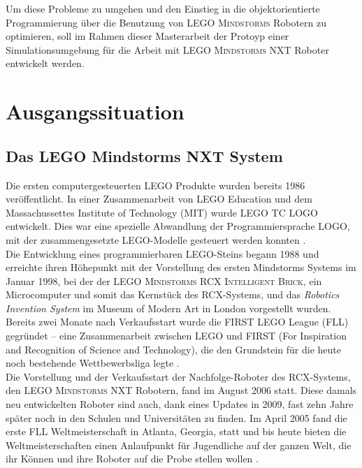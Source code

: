 \documentclass[paper=a4, pagesize, DIV=calc, BCOR=15mm, twoside=on, onecolumn=on, open = right, titlepage =on, parskip =half-, headsepline = on, footsepline = on, chapterprefix = on, appendixprefix = off, fontsize = 12pt, numbers = noenddot, abstract = on]{scrbook}
\numberwithin{equation}{chapter}
\theoremstyle{definition}
\theoremstyle{plain}
\theoremstyle{plain}
\theoremstyle{remark}
\theoremstyle{plain}
\theoremstyle{plain}
\begin{document}
Um diese Probleme zu umgehen und den Einstieg in die objektorientierte Programmierung über die Benutzung von \textsc{LEGO Mindstorms} Robotern zu optimieren, soll im Rahmen dieser Masterarbeit der Protoyp einer Simulationsumgebung für die Arbeit mit \textsc{LEGO Mindstorms} NXT Roboter entwickelt werden.
\newpage
\par\singlespacing
\chapter{Ausgangssituation}

\par\singlespacing
\section{Das LEGO Mindstorms NXT System}
\onehalfspacing
Die ersten computergesteuerten \textsc{LEGO} Produkte wurden bereits 1986 veröffentlicht. In einer Zusammenarbeit von \textsc{LEGO} Education und dem Massachussettes Institute of Technology (MIT) wurde \textsc{LEGO TC LOGO} entwickelt. Dies war eine spezielle Abwandlung der Programmiersprache LOGO, mit der zusammengesetzte \textsc{LEGO}-Modelle gesteuert werden konnten \cite{rolling:14}.\\
Die Entwicklung eines programmierbaren \textsc{LEGO}-Steins begann 1988 und erreichte ihren Höhepunkt mit der Vorstellung des ersten Mindstorms Systems im Januar 1998, bei der der \textsc{LEGO Mindstorms RCX Intelligent Brick}, ein Microcomputer und somit das Kernstück des RCX-Systems, und das \emph{Robotics Invention System} im Museum of Modern Art in London vorgestellt wurden.\\
Bereits zwei Monate nach Verkaufsstart wurde die FIRST LEGO League (FLL) gegründet -- eine Zusammenarbeit zwischen \textsc{LEGO} und FIRST (For Inspiration and Recognition of Science and Technology), die den Grundstein für die heute noch bestehende Wettbewerbsliga legte \cite{rolling:14}.\\
Die Vorstellung und der Verkaufsstart der Nachfolge-Roboter des RCX-Systems, den \textsc{LEGO Mindstorms} NXT Robotern, fand im August 2006 statt. Diese damals neu entwickelten Roboter sind auch, dank eines Updates in 2009, fast zehn Jahre später noch in den Schulen und Universitäten zu finden. Im April 2005 fand die erste FLL Weltmeisterschaft in Atlanta, Georgia, statt und bis heute bieten die Weltmeisterschaften einen Anlaufpunkt für Jugendliche auf der ganzen Welt, die ihr Können und ihre Roboter auf die Probe stellen wollen \cite{lego}.
\end{document}

